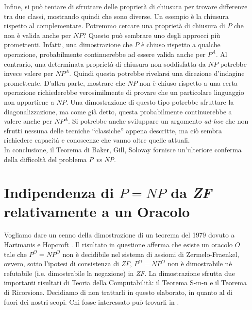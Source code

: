 \documentclass[12pt,a4paper]{report}
\theoremstyle{definition}
\begin{document}
Infine, si può tentare di sfruttare delle proprietà di chiusura per trovare differenze tra due classi, mostrando quindi che sono diverse. Un esempio è la chiusura rispetto al complementare. Potremmo cercare una proprietà di chiusura di $P$ che non è valida anche per $NP$? Questo può sembrare uno degli approcci più promettenti. Infatti, una dimostrazione che $P$ è chiuso rispetto a qualche operazione, probabilmente continuerebbe ad essere valida anche per $P^A$. Al contrario, una determinata proprietà di chiusura non soddisfatta da $NP$ potrebbe invece valere per $NP^A$. Quindi questa potrebbe rivelarsi una direzione d'indagine promettente. D'altra parte, mostrare che $NP$ non è chiuso rispetto a una certa operazione richiederebbe verosimilmente di provare che un particolare linguaggio non appartiene a $NP$. Una dimostrazione di questo tipo potrebbe sfruttare la diagonalizzazione, ma come già detto, questa probabilmente continuerebbe a valere anche per $NP^A$. Si potrebbe anche sviluppare un argomento \emph{ad-hoc} che non sfrutti nessuna delle tecniche ``classiche'' appena descritte, ma ciò sembra richiedere capacità e conoscenze che vanno oltre quelle attuali.\\
In conclusione, il Teorema di Baker, Gill, Solovay fornisce un'ulteriore conferma della difficoltà del problema \emph{P vs NP}.


\section{Indipendenza di $P=NP$ da \emph{ZF} relativamente a un Oracolo}

Vogliamo dare un cenno della dimostrazione di un teorema del 1979 dovuto a Hartmanis e Hopcroft \cite{Hopcroft:tesi}. Il risultato in questione afferma che esiste un oracolo $O$ tale che $P^O=NP^O$ non è decidibile nel sistema di assiomi di Zermelo-Fraenkel, ovvero, sotto l'ipotesi di consistenza di \emph{ZF}, $P^O=NP^O$ non è dimostrabile né refutabile (i.e. dimostrabile la negazione) in \emph{ZF}. La dimostrazione sfrutta due importanti risultati di Teoria della Computabilità: il Teorema S-m-n e il Teorema di Ricorsione. Decidiamo di non trattarli in questo elaborato, in quanto al di fuori dei nostri scopi. Chi fosse interessato può trovarli in \cite{Cutland:tesi}. 
\end{document}

